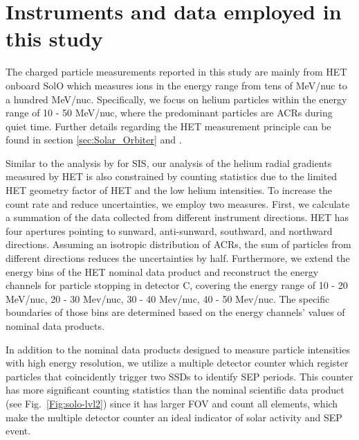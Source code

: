 \section{Instruments and data employed in this study}


The charged particle measurements reported in this study are mainly from \ac{HET} onboard \ac{SolO} which measures ions in the energy range from tens of MeV/nuc to a hundred MeV/nuc. Specifically, we focus on helium particles within the energy range of 10 - 50 MeV/nuc, where the predominant particles are \acp{ACR} during quiet time. Further details regarding the \ac{HET} measurement principle can be found in section \ref{sec:Solar_Orbiter} and \citet{RodriguezPacheco-2019-EPD}.

Similar to the analysis by \citet{Mason-2021-SolOQuietTime} for \ac{SIS}, our analysis of the helium radial gradients measured by \ac{HET} is also constrained by counting statistics due to the limited \ac{HET} geometry factor of \ac{HET} and the low helium intensities. To increase the count rate and reduce uncertainties, we employ two measures. First, we calculate a summation of the data collected from different instrument directions. \ac{HET} has four apertures pointing to sunward, anti-sunward, southward, and northward directions. Assuming an isotropic distribution of \acp{ACR}, the sum of particles from different directions reduces the uncertainties by half. Furthermore, we extend the energy bins of the \ac{HET} nominal data product and reconstruct the energy channels for particle stopping in detector C, covering the energy range of 10 - 20 MeV/nuc, 20 - 30 Mev/nuc, 30 - 40 Mev/nuc, 40 - 50 Mev/nuc. The specific boundaries of those bins are determined based on the energy channels' values of nominal data products.

In addition to the nominal data products designed to measure particle intensities with high energy resolution, we utilize a multiple detector counter which register particles that coincidently trigger two \acp{SSD} to identify \ac{SEP} periods. This counter has more significant counting statistics than the nominal scientific data product (see Fig.~\ref{Fig:solo-lvl2}) since it has larger \ac{FOV} and count all elements, which make the multiple detector counter an ideal indicator of solar activity and \ac{SEP} event. 




